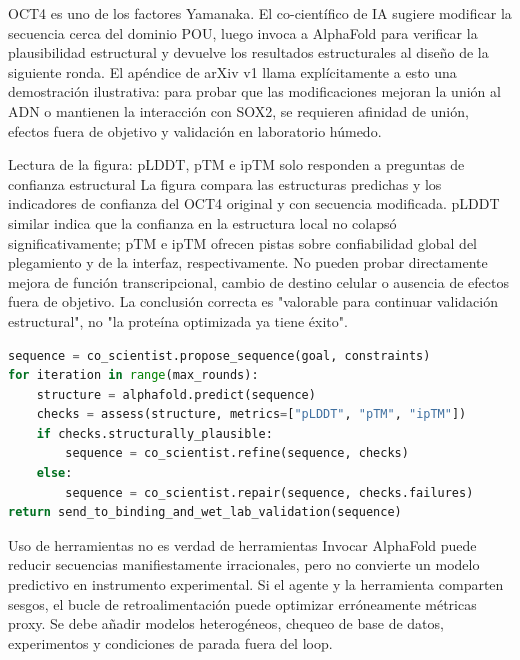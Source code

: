 OCT4 es uno de los factores Yamanaka. El co-científico de IA sugiere modificar la secuencia cerca del dominio POU, luego invoca a AlphaFold para verificar la plausibilidad estructural y devuelve los resultados estructurales al diseño de la siguiente ronda. El apéndice de arXiv v1 llama explícitamente a esto una demostración ilustrativa: para probar que las modificaciones mejoran la unión al ADN o mantienen la interacción con SOX2, se requieren afinidad de unión, efectos fuera de objetivo y validación en laboratorio húmedo.


\begin{knowledgebox}{Lectura de la figura: pLDDT, pTM e ipTM solo responden a preguntas de confianza estructural}
La figura compara las estructuras predichas y los indicadores de confianza del OCT4 original y con secuencia modificada. pLDDT similar indica que la confianza en la estructura local no colapsó significativamente; pTM e ipTM ofrecen pistas sobre confiabilidad global del plegamiento y de la interfaz, respectivamente. No pueden probar directamente mejora de función transcripcional, cambio de destino celular o ausencia de efectos fuera de objetivo. La conclusión correcta es "valorable para continuar validación estructural", no "la proteína optimizada ya tiene éxito".
\end{knowledgebox}

\begin{lstlisting}[language=Python,caption={Flujo conceptual del proceso de retroalimentación de diseño de hipótesis donde entra el modelo especializado}]
sequence = co_scientist.propose_sequence(goal, constraints)
for iteration in range(max_rounds):
    structure = alphafold.predict(sequence)
    checks = assess(structure, metrics=["pLDDT", "pTM", "ipTM"])
    if checks.structurally_plausible:
        sequence = co_scientist.refine(sequence, checks)
    else:
        sequence = co_scientist.repair(sequence, checks.failures)
return send_to_binding_and_wet_lab_validation(sequence)
\end{lstlisting}

\begin{warningbox}{Uso de herramientas no es verdad de herramientas}
Invocar AlphaFold puede reducir secuencias manifiestamente irracionales, pero no convierte un modelo predictivo en instrumento experimental. Si el agente y la herramienta comparten sesgos, el bucle de retroalimentación puede optimizar erróneamente métricas proxy. Se debe añadir modelos heterogéneos, chequeo de base de datos, experimentos y condiciones de parada fuera del loop.
\end{warningbox}

